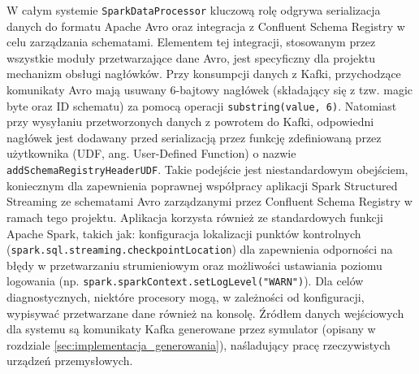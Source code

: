 \begin{enumerate}
W całym systemie \texttt{SparkDataProcessor} kluczową rolę odgrywa serializacja danych do formatu Apache Avro oraz integracja z Confluent Schema Registry w celu zarządzania schematami. Elementem tej integracji, stosowanym przez wszystkie moduły przetwarzające dane Avro, jest specyficzny dla projektu mechanizm obsługi nagłówków. Przy konsumpcji danych z Kafki, przychodzące komunikaty Avro mają usuwany 6-bajtowy nagłówek (składający się z tzw. magic byte oraz ID schematu) za pomocą operacji \texttt{substring(value, 6)}. Natomiast przy wysyłaniu przetworzonych danych z powrotem do Kafki, odpowiedni nagłówek jest dodawany przed serializacją przez funkcję zdefiniowaną przez użytkownika (UDF, ang. User-Defined Function) \cite{spark_udf} o nazwie \texttt{addSchemaRegistryHeaderUDF}. Takie podejście jest niestandardowym obejściem, koniecznym dla zapewnienia poprawnej współpracy aplikacji Spark Structured Streaming ze schematami Avro zarządzanymi przez Confluent Schema Registry \cite{confluent_schema_registry} w ramach tego projektu. Aplikacja korzysta również ze standardowych funkcji Apache Spark, takich jak: konfiguracja lokalizacji punktów kontrolnych (\texttt{spark.sql.streaming.checkpointLocation}) dla zapewnienia odporności na błędy w przetwarzaniu strumieniowym oraz możliwości ustawiania poziomu logowania (np. \texttt{spark.sparkContext.setLogLevel("WARN")}). Dla celów diagnostycznych, niektóre procesory mogą, w zależności od konfiguracji, wypisywać przetwarzane dane również na konsolę. Źródłem danych wejściowych dla systemu są komunikaty Kafka generowane przez symulator (opisany w rozdziale \ref{sec:implementacja_generowania}), naśladujący pracę rzeczywistych urządzeń przemysłowych.

\end{enumerate}